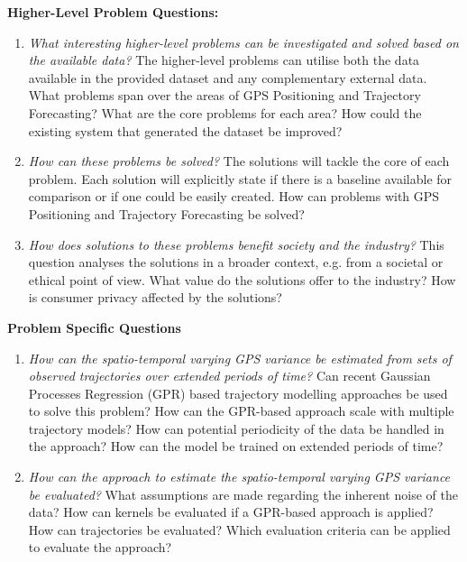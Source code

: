 \begin{description}
  \item \textbf{Higher-Level Problem Questions:}
  \begin{enumerate}
    \item \textit{What interesting higher-level problems can be investigated and solved based on the available data?} \newline
    The higher-level problems can utilise both the data available in the provided dataset and any complementary external data.
    What problems span over the areas of GPS Positioning and Trajectory Forecasting?
    What are the core problems for each area?
    How could the existing system that generated the dataset be improved?
    \item \textit{How can these problems be solved?} \newline
    The solutions will tackle the core of each problem.
    Each solution will explicitly state if there is a baseline available for comparison or if one could be easily created.
    How can problems with GPS Positioning and Trajectory Forecasting be solved?
    \item \textit{How does solutions to these problems benefit society and the industry?} \newline
    This question analyses the solutions in a broader context, e.g. from a societal or ethical point of view.
    What value do the solutions offer to the industry?
    How is consumer privacy affected by the solutions?
  \end{enumerate}

  \item \textbf{Problem Specific Questions}
  \begin{enumerate}
    \item \textit{How can the spatio-temporal varying GPS variance be estimated from sets of observed trajectories over extended periods of time?}
    Can recent Gaussian Processes Regression (GPR) based trajectory modelling approaches be used to solve this problem?
    How can the GPR-based approach scale with multiple trajectory models?
    How can potential periodicity of the data be handled in the approach?
    How can the model be trained on extended periods of time?
    \item \textit{How can the approach to estimate the spatio-temporal varying GPS variance be evaluated?} \newline
    What assumptions are made regarding the inherent noise of the data?
    How can kernels be evaluated if a GPR-based approach is applied?
    How can trajectories be evaluated?
    Which evaluation criteria can be applied to evaluate the approach?


\end{enumerate}
\end{description}
